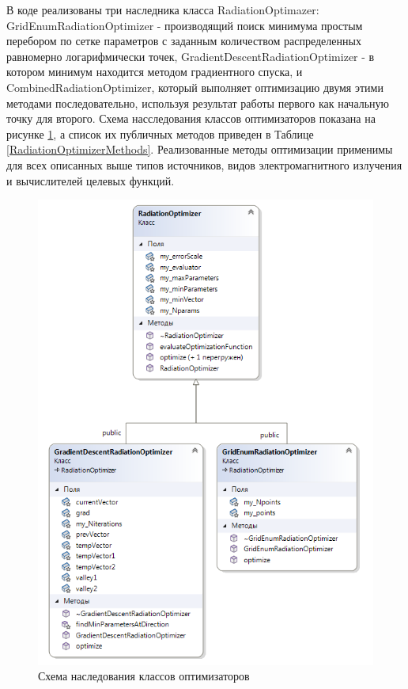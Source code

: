 В коде реализованы три наследника класса RadiationOptimazer: GridEnumRadiationOptimizer - производящий поиск минимума простым перебором по сетке параметров с заданным количеством распределенных равномерно логарифмически точек, GradientDescentRadiationOptimizer - в котором минимум находится методом градиентного спуска, и CombinedRadiationOptimizer, который выполняет оптимизацию двумя этими методами последовательно, используя результат работы первого как начальную точку для второго. Схема насследования классов оптимизаторов показана на рисунке \ref{radiationOptimizer}, а список их публичных методов приведен в Таблице \ref{RadiationOptimizerMethods}. Реализованные методы оптимизации применимы для всех описанных выше типов источников, видов электромагнитного излучения и вычислителей целевых функций.
\begin{figure}
	\centering
	\includegraphics[width=11.5 cm]{./fig/radiationOptimizer.png} 
	\caption{Схема наследования классов оптимизаторов}
	\label{radiationOptimizer}
\end{figure}

